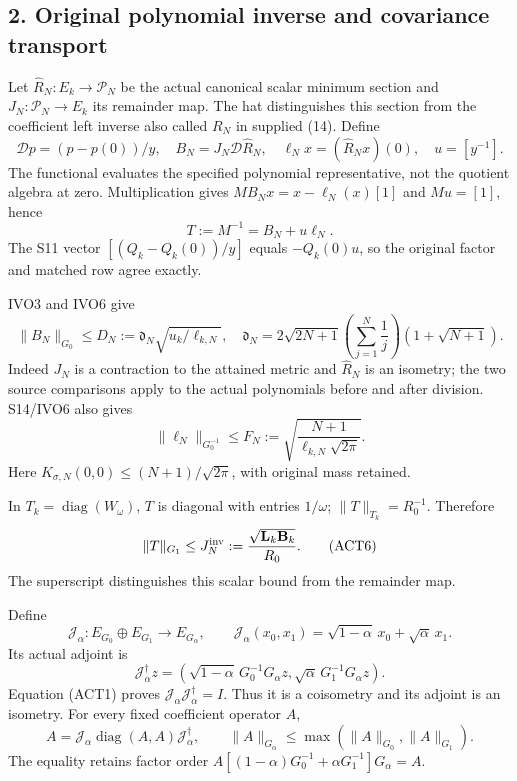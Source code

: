 \documentclass[11pt]{article}
\begin{document}
\subsection{2. Original polynomial inverse and covariance transport}\label{original-polynomial-inverse-and-covariance-transport}

Let \(\widehat R_N:E_k\to\mathcal P_N\) be the actual canonical scalar minimum section and \(J_N:\mathcal P_N\to E_k\) its remainder map. The hat distinguishes this section from the coefficient left inverse also called \(R_N\) in supplied (14). Define \[
\mathscr Dp=(p-p(0))/y,\quad B_N=J_N\mathscr D\widehat R_N,\quad
\ell_Nx=(\widehat R_Nx)(0),\quad u=[y^{-1}].
\] The functional evaluates the specified polynomial representative, not the quotient algebra at zero. Multiplication gives \(MB_Nx=x-\ell_N(x)[1]\) and \(Mu=[1]\), hence \[
\boxed{T:=M^{-1}=B_N+u\ell_N.}\tag{ACT3}
\] The S11 vector \([(Q_k-Q_k(0))/y]\) equals \(-Q_k(0)u\), so the original factor and matched row agree exactly.

IVO3 and IVO6 give \[
\|B_N\|_{G_0}\le
D_N:=\mathfrak d_N\sqrt{u_k/\ell_{k,N}},\quad
\mathfrak d_N=2\sqrt{2N+1}\left(\sum_{j=1}^N\frac1j\right)(1+\sqrt{N+1}).
\tag{ACT4}
\] Indeed \(J_N\) is a contraction to the attained metric and \(\widehat R_N\) is an isometry; the two source comparisons apply to the actual polynomials before and after division. S14/IVO6 also gives \[
\|\ell_N\|_{G_0^{-1}}\le
F_N:=\sqrt{\frac{N+1}{\ell_{k,N}\sqrt{2\pi}}}.
\tag{ACT5}
\] Here \(K_{\sigma,N}(0,0)\le(N+1)/\sqrt{2\pi}\), with original mass retained.

In \(T_k=\operatorname{diag}(W_\omega)\), \(T\) is diagonal with entries \(1/\omega\); \(\|T\|_{T_k}=R_0^{-1}\). Therefore \[
\|T\|_{G_1}\le J_N^{\rm inv}:=\frac{\sqrt{\mathbf L_k\mathbf B_k}}{R_0}.
\tag{ACT6}
\] The superscript distinguishes this scalar bound from the remainder map.

Define \[
\mathcal J_\alpha:E_{G_0}\oplus E_{G_1}\to E_{G_\alpha},\qquad
\mathcal J_\alpha(x_0,x_1)=\sqrt{1-\alpha}\,x_0+\sqrt\alpha\,x_1.
\] Its actual adjoint is \[
\mathcal J_\alpha^\dagger z=
(\sqrt{1-\alpha}\,G_0^{-1}G_\alpha z,\sqrt\alpha\,G_1^{-1}G_\alpha z).
\] Equation (ACT1) proves \(\mathcal J_\alpha\mathcal J_\alpha^\dagger=I\). Thus it is a coisometry and its adjoint is an isometry. For every fixed coefficient operator \(A\), \[
A=\mathcal J_\alpha\operatorname{diag}(A,A)\mathcal J_\alpha^\dagger,\qquad
\|A\|_{G_\alpha}\le\max(\|A\|_{G_0},\|A\|_{G_1}).
\tag{ACT7}
\] The equality retains factor order \(A[(1-\alpha)G_0^{-1}+\alpha G_1^{-1}]G_\alpha=A\).
\end{document}
